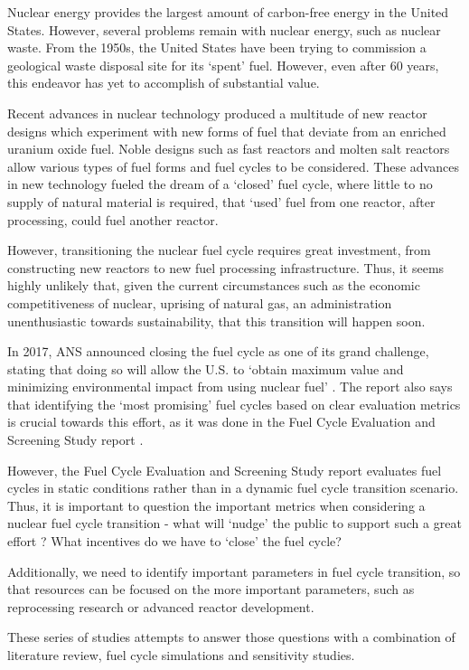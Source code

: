 Nuclear energy provides the largest amount of carbon-free energy
in the United States. However, several problems remain with nuclear
energy, such as nuclear waste.
From the 1950s, the United States have been trying to commission a
geological waste disposal site for its `spent' fuel. However, even
after 60 years, this endeavor has yet to accomplish of substantial value.

Recent advances in nuclear technology produced
a multitude of new reactor designs which experiment with new forms
of fuel that deviate from an enriched uranium oxide fuel.
Noble designs such as fast reactors and molten salt reactors
allow various types of fuel forms and fuel cycles to be considered. These advances in new
technology fueled the dream of a `closed' fuel cycle, where little to no
supply of natural material is required, that `used' fuel from one reactor,
after processing, could fuel another reactor.

However, transitioning the nuclear fuel cycle requires great investment,
from constructing new reactors to new fuel processing infrastructure.
Thus, it seems highly unlikely that, given the current circumstances
such as the economic competitiveness of nuclear, uprising of natural
gas, an administration unenthusiastic towards sustainability, that
this transition will happen soon.

In 2017, \gls{ANS} announced closing the fuel cycle as one of its
grand challenge, stating that doing so will allow the U.S.
to `obtain maximum value and minimizing environmental
impact from using nuclear fuel' \cite{_ans_2017}.
The report also says that identifying the `most promising'
fuel cycles based on clear evaluation metrics is crucial towards
this effort, as it was done in the Fuel Cycle Evaluation and Screening
Study report \cite{wigeland_nuclear_2014}.

However, the Fuel Cycle Evaluation and Screening Study report
evaluates fuel cycles in static conditions rather than
in a dynamic fuel cycle transition scenario.
Thus, it is important to question the important metrics when considering
a nuclear fuel cycle transition - what will `nudge'\cite{leonard_richard_2008}
the public to support such a great effort ? What incentives
do we have to `close' the fuel cycle?

Additionally, we need to identify important parameters in
fuel cycle transition, so that resources can be
focused on the more important parameters, such as reprocessing
research or advanced reactor development.

These series of studies attempts to answer those questions with a
combination of literature review, fuel cycle simulations and sensitivity
studies.
